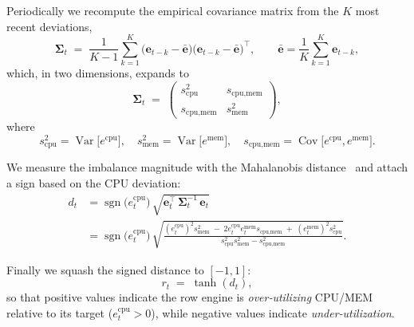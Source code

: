 \documentclass[sigconf, nonacm]{acmart}
\begin{document}
Periodically we recompute the empirical covariance matrix from the
\(K\) most recent deviations,
\begin{equation}
  \boldsymbol\Sigma_t \;=\;
  \frac{1}{K-1}\sum_{k=1}^{K}
      \bigl(\mathbf e_{t-k}-\bar{\mathbf e}\bigr)
      \bigl(\mathbf e_{t-k}-\bar{\mathbf e}\bigr)^{\!\top},
  \qquad
  \bar{\mathbf e}=\frac{1}{K}\sum_{k=1}^{K}\mathbf e_{t-k},
\end{equation}
which, in two dimensions, expands to
\begin{equation}
  \boldsymbol\Sigma_t
    \;=\;
    \begin{pmatrix}
      s_{\text{cpu}}^{2} & s_{\text{cpu,mem}} \\
      s_{\text{cpu,mem}} & s_{\text{mem}}^{2}
    \end{pmatrix},
\end{equation}
where
\begin{equation}
    s_{\text{cpu}}^{2}
    = \operatorname{Var}\!\bigl[e^{\text{cpu}}\bigr], \quad
  s_{\text{mem}}^{2}
    = \operatorname{Var}\!\bigl[e^{\text{mem}}\bigr], \quad
  s_{\text{cpu,mem}}
    = \operatorname{Cov}\!\bigl[e^{\text{cpu}},e^{\text{mem}}\bigr].
\end{equation}
  



We measure the imbalance magnitude with the Mahalanobis distance~\cite{mclachlan1999mahalanobis} and
attach a sign based on the CPU deviation:
\begin{equation}
\begin{split}
  d_t
  &= \operatorname{sgn}\!\bigl(e_t^{\text{cpu}}\bigr)\,
     \sqrt{\mathbf e_t^{\top}\,\boldsymbol\Sigma_t^{-1}\,\mathbf e_t} \\[2pt]
  &= \operatorname{sgn}\!\bigl(e_t^{\text{cpu}}\bigr)\,
     \sqrt{\frac{(e_t^{\text{cpu}})^2 s_{\text{mem}}^{2}
                 \;-\; 2 e_t^{\text{cpu}} e_t^{\text{mem}} s_{\text{cpu,mem}}
                 \;+\; (e_t^{\text{mem}})^2 s_{\text{cpu}}^{2}}
                {s_{\text{cpu}}^{2}s_{\text{mem}}^{2}-s_{\text{cpu,mem}}^{2}} } .
\end{split}
\end{equation}


Finally we squash the signed distance to \([-1,1]\):
\[
  r_t \;=\; \tanh(d_t),
\]
so that positive values indicate the row engine is
\emph{over‑utilizing} CPU/MEM relative to its target
(\(e_t^{\text{cpu}}>0\)), while negative values indicate
\emph{under‑utilization}.
\end{document}
